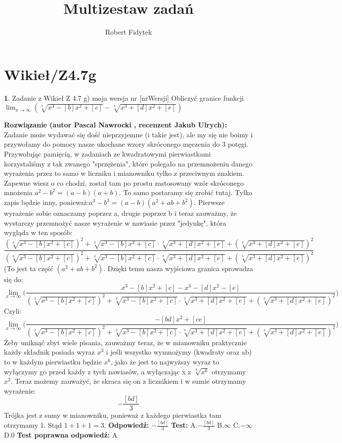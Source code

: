 \documentclass[12pt, a4paper]{article}
\title{Multizestaw zadań}
\author{Robert Fidytek}
\date{}
\theoremstyle{definition} %
\newtheorem{zad}{}
\newcommand{\kategoria}[1]{\section{#1}} %
\newcommand{\zadStart}[1]{\begin{zad}#1\newline} %
\newcommand{\zadStop}{\end{zad}}   %
\newcommand{\rozwStart}[2]{\noindent \textbf{Rozwiązanie (autor #1 , recenzent #2): }\newline} %
\newcommand{\rozwStop}{\newline}                                            %
\newcommand{\odpStart}{\noindent \textbf{Odpowiedź:}\newline}    %
\newcommand{\odpStop}{\newline}                                             %
\newcommand{\testStart}{\noindent \textbf{Test:}\newline} %
\newcommand{\testStop}{\newline} %
\newcommand{\kluczStart}{\noindent \textbf{Test poprawna odpowiedź:}\newline} %
\newcommand{\kluczStop}{\newline} %
\begin{document}
\maketitle


\kategoria{Wikieł/Z4.7g}
\zadStart{Zadanie z Wikieł Z 4.7 g) moja wersja nr [nrWersji]}
Obliczyć granice funkcji $\displaystyle{\lim_{x \to \infty}}(\sqrt[3]{x^3-[b]x^2+[c]}-\sqrt[3]{x^3+[d]x^2+[e]})$
\zadStop
\rozwStart{Pascal Nawrocki}{Jakub Ulrych}
Zadanie może wydawać się dość nieprzyjemne (i takie jest), ale my się nie boimy i przywołamy do pomocy nasze ukochane wzory skróconego męczenia do 3 potęgi. Przywołując pamięcią, w zadaniach ze kwadratowymi pierwiastkami korzystaliśmy z tak zwanego "sprzężenia", które polegało na przemnożeniu danego wyrażenia przez to samo w liczniku i mianowniku tylko z przeciwnym znakiem. Zapewne wiesz o co chodzi, został tam po prostu zastosowany wzór skróconego mnożenia $a^2-b^2=(a-b)(a+b)$. To samo postaramy się zrobić tutaj. Tylko zapis będzie inny, ponieważ:$a^3-b^3=(a-b)(a^2+ab+b^2)$. Pierwsze wyrażenie sobie oznaczamy poprzez a, drugie poprzez b i teraz zauważmy, że wystarczy przemnożyć nasze wyrażenie w nawiasie przez "jedynkę", która wygląda w ten sposób:
$$\frac{(\sqrt[3]{x^3-[b]x^2+[c]})^2+\sqrt[3]{x^3-[b]x^2+[c]}\cdot\sqrt[3]{x^3+[d]x^2+[e]}+(\sqrt[3]{x^3+[d]x^2+[e]})^2}{(\sqrt[3]{x^3-[b]x^2+[c]})^2+\sqrt[3]{x^3-[b]x^2+[c]}\cdot\sqrt[3]{x^3+[d]x^2+[e]}+(\sqrt[3]{x^3+[d]x^2+[e]})^2}$$
(To jest ta część $(a^2+ab+b^2)$.
Dzięki temu nasza wyjściowa granica sprowadza się do:
$$\displaystyle{\lim_{x \to \infty}}\bigg(\frac{x^3-[b]x^2+[c]-x^3-[d]x^2-[e]}{(\sqrt[3]{x^3-[b]x^2+[c]})^2+\sqrt[3]{x^3-[b]x^2+[c]}\cdot\sqrt[3]{x^3+[d]x^2+[e]}+(\sqrt[3]{x^3+[d]x^2+[e]})^2}\bigg)$$
Czyli:
$$\displaystyle{\lim_{x \to \infty}}\bigg(\frac{-[bd]x^2+[ce]}{(\sqrt[3]{x^3-[b]x^2+[c]})^2+\sqrt[3]{x^3-[b]x^2+[c]}\cdot\sqrt[3]{x^3+[d]x^2+[e]}+(\sqrt[3]{x^3+[d]x^2+[e]})^2}\bigg)$$
Żeby uniknąć zbyt wiele pisania, zauważmy teraz, że w mianowniku praktycznie każdy składnik posiada wyraz $x^3$ i jeśli wszystko wymnożymy (kwadraty oraz ab) to w każdym pierwiastku będzie $x^6$, jako że jest to najwyższy wyraz to wyłączymy go przed każdy z tych nawiasów, a wyłączając x z $\sqrt[3]{x^6}$ otrzymamy $x^2$. Teraz możemy zauważyć, że skraca się on z licznikiem i w sumie otrzymamy wyrażenie:
$$-\frac{[bd]}{3}$$ Trójka jest z sumy w mianowniku, ponieważ z każdego pierwiastka tam otrzymamy 1. Stąd $1+1+1=3$.
\rozwStop
\odpStart
$-\frac{[bd]}{3}$
\odpStop
\testStart
A.$-\frac{[bd]}{3}$
B.$\infty$
C.$-\infty$
D.$0$
\testStop
\kluczStart
A
\kluczStop
\end{document}
